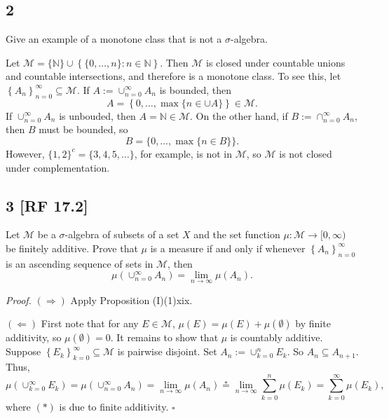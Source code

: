 \documentclass[12pt]{article}
\newcounter{ProofCounter}
\newenvironment{Proof}{\stepcounter{ProofCounter}\textit{Proof.}}{\hfill$\square$}
\begin{document}
\newpage
\subsection*{2}
\begin{tcolorbox}
Give an example of a monotone class that is not a $\sigma$-algebra.
\end{tcolorbox}

Let $\mathcal{M} = \{\mathbb{N}\} \cup \left\{ \{0,\hdots,n\} : n \in \mathbb{N} \right\}$. Then $\mathcal{M}$ is closed under
countable unions and countable intersections, and therefore is a monotone class. To see this, let $\left\{ A_{n} \right\}_{n=0}^{\infty}\subseteq
\mathcal{M}$. If $A := \cup_{n=0}^{\infty}A_{n}$ is bounded, then 
\[ A = \left\{ 0, \hdots, \max\{n \in \cup A\} \right\} \in \mathcal{M}. \]
If $\cup_{n=0}^{\infty}A_{n}$ is unbouded, then $A = \mathbb{N} \in \mathcal{M}$. On the other hand, if $B := \cap_{n=0}^{\infty}A_{n}$, then 
$B$ must be bounded, so 
\[ B = \{0,\hdots, \max\{n \in B\}\}. \]
However, $\{1,2\}^{c} = \{3, 4, 5, \hdots\}$, for example, is not in
$\mathcal{M}$, so $\mathcal{M}$ is not closed under complementation.



\subsection*{3 [RF 17.2]}
\begin{tcolorbox}
Let $\mathcal{M}$ be a $\sigma$-algebra of subsets of a set $X$ and the set function $\mu : \mathcal{M} \rightarrow [0, \infty)$ be finitely additive.
Prove that $\mu$ is a measure if and only if whenever $\left\{ A_{n} \right\}_{n=0}^{\infty}$ is an ascending sequence of sets in $\mathcal{M}$, then 
\[ \mu\left( \cup_{n=0}^{\infty}A_{n} \right) = \lim_{n\rightarrow\infty}\mu(A_{n}). \]
\end{tcolorbox}


\begin{Proof}
$(\Rightarrow)$ Apply Proposition (I)(1)xix.

$(\Leftarrow)$ First note that for any $E \in \mathcal{M}$, $\mu(E) = \mu(E) + \mu(\emptyset)$ by finite additivity, so $\mu(\emptyset) = 0$. It
remains to show that $\mu$ is countably additive. Suppose $\left\{ E_{k} \right\}_{k=0}^{\infty} \subseteq \mathcal{M}$ is pairwise disjoint. Set
$A_{n} := \cup_{k=0}^{n}E_{k}$. So $A_{n} \subseteq A_{n+1}$. Thus,
\[ \mu\left( \cup_{k=0}^{\infty}E_{k} \right) = \mu\left( \cup_{n=0}^{\infty}A_{n} \right) = \lim_{n\rightarrow\infty}\mu(A_{n}) \stackrel{*}{=}
\lim_{n\rightarrow\infty}\sum_{k=0}^{n}\mu(E_{k}) = \sum_{k=0}^{\infty}\mu(E_{k}), \]
where $(*)$ is due to finite additivity.
\end{Proof}
\end{document}
